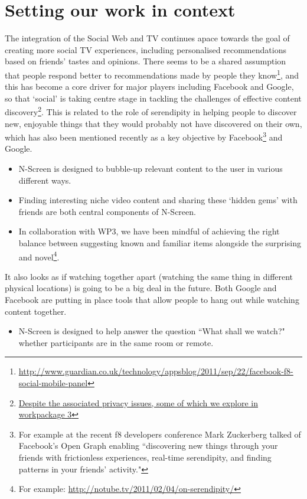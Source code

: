 \documentclass{notube}
\begin{document}
\chapter{Setting our work in context}

The integration of the Social Web and TV continues apace towards the goal of creating more social TV experiences, including personalised recommendations based on friends' tastes and opinions. There seems to be a shared assumption that people respond better to recommendations made by people they know\footnote{\url{http://www.guardian.co.uk/technology/appsblog/2011/sep/22/facebook-f8-social-mobile-panel}}, and this has become a core driver for major players including Facebook and Google, so that `social' is taking centre stage in tackling the challenges of effective content discovery\footnote{\url{Despite the associated privacy issues, some of which we explore in workpackage 3}}. This is related to the role of serendipity in helping people to discover new, enjoyable things that they would probably not have discovered on their own, which has also been mentioned recently as a key objective by Facebook\footnote{For example at the recent f8 developers conference Mark Zuckerberg talked of  Facebook's Open Graph enabling ``discovering new things through your friends with frictionless experiences, real-time serendipity, and finding patterns in your friends' activity."}  and Google. 

\begin{itemize}
\item{N-Screen is designed to bubble-up relevant content to the user in various different ways.}
\item{Finding interesting niche video content and sharing these `hidden gems' with friends are both central components of N-Screen.}
\item{In collaboration with WP3, we have been mindful of achieving the right balance between suggesting known and familiar items alongside the surprising and novel\footnote{For example: \url{http://notube.tv/2011/02/04/on-serendipity/}}.}
\end{itemize}

It also looks as if watching together apart (watching the same thing in different physical locations) is going to be a big deal in the future. Both Google and Facebook are putting in place tools that allow people to hang out while watching content together.

\begin{itemize}
\item{N-Screen is designed to help answer the question ``What shall we watch?" whether participants are in the same room or remote.}
\end{itemize}
\end{document}
